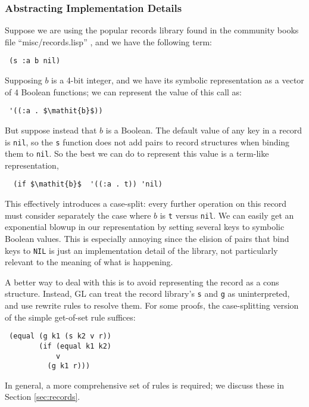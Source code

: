 \documentclass[submission,copyright,creativecommons]{eptcs}
\begin{document}
\subsubsection{Abstracting Implementation Details}
Suppose we are using the popular records library found in the
community books file ``misc/records.lisp''
\cite{kaufmann2002efficient}, and we have the following term:
\begin{verbatim}
 (s :a b nil)
\end{verbatim}
Supposing $\mathit{b}$ is a 4-bit integer, and we have its symbolic
representation as a vector of 4 Boolean functions; we can represent
the value of this call as:
\begin{lstlisting}
 '((:a . $\mathit{b}$))
\end{lstlisting}
But suppose instead that $\mathit{b}$ is a Boolean.  The default value
of any key in a record is \texttt{nil}, so the \texttt{s} function
does not add pairs to record structures when binding them to
\texttt{nil}.  So the best we can do to represent this value is a term-like representation,
\begin{lstlisting}
  (if $\mathit{b}$  '((:a . t)) 'nil)
\end{lstlisting}
This effectively introduces a case-split: every further operation on
this record must consider separately the case where $\mathit{b}$ is
\texttt{t} versus \texttt{nil}.  We can easily get an exponential
blowup in our representation by setting several keys to symbolic
Boolean values.  This is especially annoying since the elision of
pairs that bind keys to \texttt{NIL} is just an implementation detail
of the library, not particularly relevant to the meaning of what is
happening.

A better way to deal with this is to avoid representing the record as
a cons structure.  Instead, GL can treat the record library's
\texttt{s} and \texttt{g} as uninterpreted, and use rewrite rules to
resolve them.  For some proofs, the case-splitting version of the
simple get-of-set rule suffices:
\begin{verbatim}
 (equal (g k1 (s k2 v r))
        (if (equal k1 k2)
            v
          (g k1 r)))
\end{verbatim}
\noindent In general, a more comprehensive set of rules is required;
we discuss these in Section \ref{sec:records}.
\end{document}
